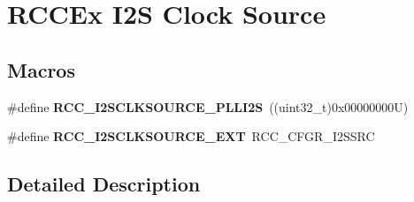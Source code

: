 \hypertarget{group___r_c_c_ex___i2_s___clock___source}{}\section{R\+C\+C\+Ex I2S Clock Source}
\label{group___r_c_c_ex___i2_s___clock___source}
\subsection*{Macros}
\begin{DoxyCompactItemize}
\item 
\mbox{\label{group___r_c_c_ex___i2_s___clock___source_ga77d2d5726213f7452c87251cfddc9d6a}} 
\#define {\bfseries R\+C\+C\+\_\+\+I2\+S\+C\+L\+K\+S\+O\+U\+R\+C\+E\+\_\+\+P\+L\+L\+I2S}~((uint32\+\_\+t)0x00000000\+U)
\item 
\mbox{\label{group___r_c_c_ex___i2_s___clock___source_gaf36ed164172cd329651775784798a3ba}} 
\#define {\bfseries R\+C\+C\+\_\+\+I2\+S\+C\+L\+K\+S\+O\+U\+R\+C\+E\+\_\+\+E\+XT}~R\+C\+C\+\_\+\+C\+F\+G\+R\+\_\+\+I2\+S\+S\+RC
\end{DoxyCompactItemize}


\subsection{Detailed Description}
